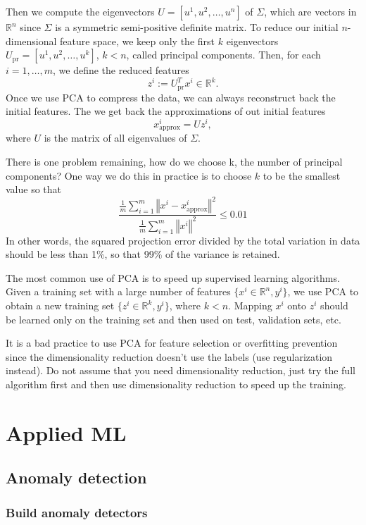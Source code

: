 \documentclass[a4paper,11pt]{report}
\newcommand{\norm}[1]{\left\Vert#1\right\Vert}
\begin{document}
Then we compute the eigenvectors $U = [u^1, u^2, \ldots, u^n]$ of $\Sigma$, which are vectors in $\mathbb{R}^n$ since $\Sigma$ is a symmetric semi-positive definite matrix. To reduce our initial $n$-dimensional feature space, we keep only the first $k$ eigenvectors $U_\text{pr} = [u^1, u^2, \ldots, u^k]$, $k<n$, called principal components. Then, for each $i=1,\ldots, m$, we define the reduced features
$$z^i := U_\text{pr}^T x^i \in \mathbb{R}^k.$$
Once we use PCA to compress the data, we can always reconstruct back the initial features. The we get back the approximations of out initial features $$x_{\text{approx}}^i = Uz^i,$$ where $U$ is the matrix of all eigenvalues of $\Sigma$.


There is one problem remaining, how do we choose k, the number of principal components? One way we do this in practice is to choose $k$ to be the smallest value so that
$$\dfrac{\frac{1}{m}\sum_{i=1}^{m}{\norm{x^i - x_{\text{approx}}^i}^2}}{\frac{1}{m}\sum_{i=1}^{m}{\norm{x^i}^2}} \leq 0.01$$
In other words, the squared projection error divided by the total variation in data should be less than 1\%, so that 99\% of the variance is retained.

The most common use of PCA is to speed up supervised learning algorithms. Given a training set with a large number of features $\{x^i\in\mathbb{R}^n, y^i\}$, we use PCA to obtain a new training set $\{z^i\in\mathbb{R}^k, y^i\}$, where $k<n$. Mapping $x^i$ onto $z^i$ should be learned only on the training set and then used on test, validation sets, etc.

It is a bad practice to use PCA for feature selection or overfitting prevention since the dimensionality reduction doesn't use the labels (use regularization instead). Do not assume that you need dimensionality reduction, just try the full algorithm first and then use dimensionality reduction to speed up the training.


\chapter{Applied ML}

\section{Anomaly detection}

\subsection*{Build anomaly detectors}
\end{document}
